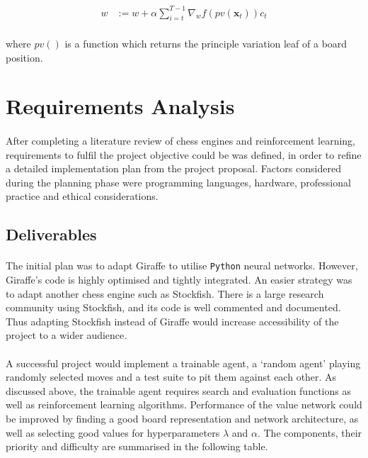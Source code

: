 \documentclass[12pt,a4paper]{book}
\begin{document}
\begin{align*}
  w &:= w + \alpha \sum_{i=t}^{T-1} \nabla_w f(pv(\mathbf{x}_t)) c_t
\end{align*}

\paragraph{} where $pv()$ is a function which returns the principle variation leaf of a board position.

\section{Requirements Analysis}

\paragraph{} After completing a literature review of chess engines and reinforcement learning, requirements to fulfil the project objective could be was defined, in order to refine a detailed implementation plan from the project proposal. Factors considered during the planning phase were programming languages, hardware, professional practice and ethical considerations.

\subsection{Deliverables}

\paragraph{} The initial plan was to adapt Giraffe to utilise \texttt{Python} neural networks. However, Giraffe's code is highly optimised and tightly integrated. An easier strategy was to adapt another chess engine such as Stockfish. There is a large research community using Stockfish, and its code is well commented and documented. Thus adapting Stockfish instead of Giraffe would increase accessibility of the project to a wider audience.

\paragraph{} A successful project would implement a trainable agent, a `random agent' playing randomly selected moves and a test suite to pit them against each other. As discussed above, the trainable agent requires search and evaluation functions as well as reinforcement learning algorithms. Performance of the value network could be improved by finding a good board representation and network architecture, as well as selecting good values for hyperparameters $\lambda$ and $\alpha$. The components, their priority and difficulty are summarised in the following table.
\end{document}

